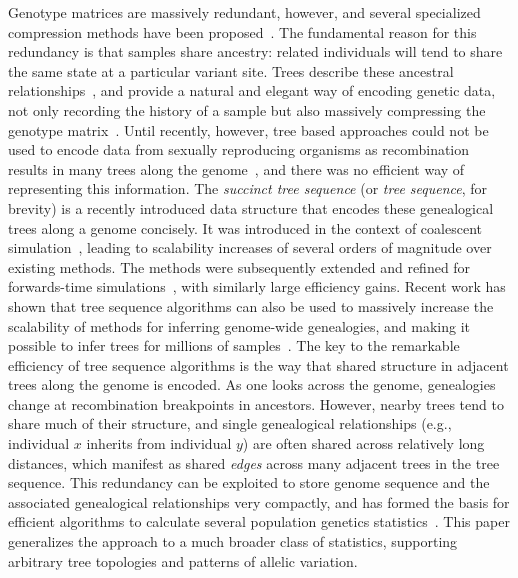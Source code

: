 \documentclass{article}
\begin{document}
Genotype matrices are massively redundant, however, and several specialized
compression methods have been proposed~\citep{
christley2008human,qiao2012handling,durbin2014efficient,sambo2014compression,layer2016efficient,
danek2018gtc,lin2019sparse}.
The fundamental reason for this redundancy is that samples share ancestry:
related individuals will tend to share the same state at a particular variant site.
Trees describe these ancestral
relationships~\citep{felsenstein2004inferring,semple2003phylogenetics},
and provide a natural and elegant way of encoding genetic data,
not only recording the history of a sample but also massively compressing
the genotype matrix~\citep{ane2005missing}. Until recently, however,
tree based approaches could not be used to encode data from sexually
reproducing organisms as recombination results in many trees along the
genome~\citep{hudson1983properties,griffiths1991two,griffiths1996ancestral,rasmussen2014genome},
and there was no efficient way of representing this information.
The \emph{succinct tree sequence} (or \emph{tree sequence}, for brevity)
is a recently introduced data structure that
encodes these genealogical trees along a genome concisely.
It was introduced in the context of coalescent
simulation~\citep{kelleher2016efficient}, leading to scalability increases of
several orders of magnitude over existing methods. The methods were subsequently extended
and refined for forwards-time
simulations~\citep{kelleher2018efficient,haller2018tree}, with similarly large efficiency gains.
Recent work has shown that tree sequence algorithms can
also be used to massively increase the scalability of methods for inferring
genome-wide genealogies, and making it possible to infer trees for millions of
samples~\citep{kelleher2019inferring}.
The key to the remarkable efficiency of tree sequence
algorithms is the way that shared structure in adjacent trees along the genome is encoded.
As one looks across the genome, genealogies change at recombination breakpoints in ancestors.
However, nearby trees tend to share much of their structure,
and single genealogical relationships (e.g., individual $x$ inherits from individual $y$)
are often shared across relatively long distances,
which manifest as shared \emph{edges} across many adjacent trees in the tree sequence.
This redundancy can be exploited to store genome sequence and the
associated genealogical relationships very compactly, and has formed the basis for
efficient algorithms to calculate several population genetics
statistics~\citep{kelleher2016efficient}.
This paper generalizes the approach to a much broader class of statistics,
supporting arbitrary tree topologies and patterns of allelic variation.
\end{document}
